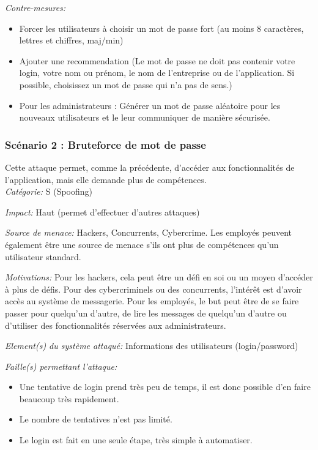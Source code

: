 \documentclass{article}
\begin{document}
\textit{Contre-mesures:}

\begin{itemize}

\item
  Forcer les utilisateurs à choisir un mot de passe fort (au moins 8
  caractères, lettres et chiffres, maj/min)
\item
  Ajouter une recommendation (Le mot de passe ne doit pas contenir
  votre login, votre nom ou prénom, le nom de l'entreprise ou de
  l'application. Si possible, choisissez un mot de passe qui n'a pas de
  sens.)
\item
  Pour les administrateurs : Générer un mot de passe aléatoire pour les
  nouveaux utilisateurs et le leur communiquer de manière sécurisée.
\end{itemize}

\subsubsection{Scénario 2 : Bruteforce de mot de passe}

Cette attaque permet, comme la précédente, d'accéder aux fonctionnalités
de l'application, mais elle demande plus de compétences.\\

\textit{Catégorie:} S (Spoofing)

\textit{Impact:} Haut (permet d'effectuer d'autres attaques)

\textit{Source de menace:} Hackers, Concurrents, Cybercrime. Les
employés peuvent également être une source de menace s'ils ont plus de
compétences qu'un utilisateur standard.

\textit{Motivations:} Pour les hackers, cela peut être un défi en soi ou un moyen d'accéder à plus de défis. Pour des cybercriminels ou des concurrents, l'intérêt est d'avoir accès au système de messagerie. Pour les employés, le but peut être de se faire passer pour quelqu'un d'autre, de lire les messages de quelqu'un d'autre ou d'utiliser des
fonctionnalités réservées aux administrateurs.

\textit{Element(s) du système attaqué:} Informations des utilisateurs
(login/password)

\textit{Faille(s) permettant l'attaque:}

\begin{itemize}

\item
  Une tentative de login prend très peu de temps, il est donc possible
  d'en faire beaucoup très rapidement.
\item
  Le nombre de tentatives n'est pas limité.
\item
  Le login est fait en une seule étape, très simple à automatiser.
\end{itemize}
\end{document}
